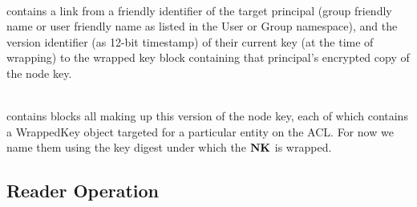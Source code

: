 \\
contains a link from a friendly identifier of the target principal
(group friendly name or user friendly name as listed in the User or
Group namespace), and the version identifier (as 12-bit timestamp) of
their current key (at the time of wrapping) to the wrapped key block
containing that principal's encrypted copy of the node key.

\\
contains blocks all making up this version of the node key, each of
which contains a WrappedKey object targeted for a particular entity on
the ACL. For now we name them using the key digest under which the
${\textbf{NK}}$ is wrapped.

\subsection{Reader Operation}

